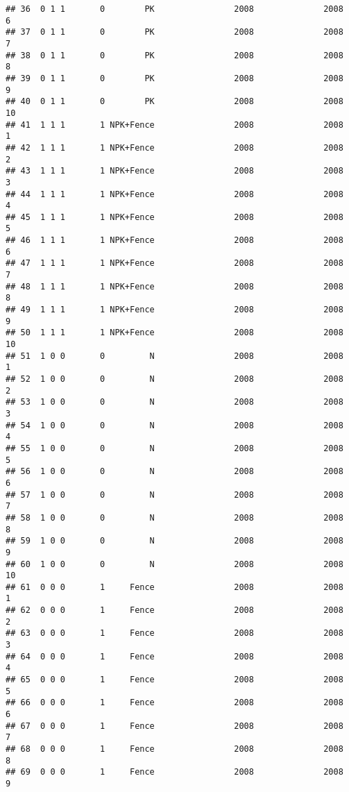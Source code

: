 \documentclass[]{article}
\begin{document}
\begin{verbatim}
## 36  0 1 1       0        PK                2008              2008        6
## 37  0 1 1       0        PK                2008              2008        7
## 38  0 1 1       0        PK                2008              2008        8
## 39  0 1 1       0        PK                2008              2008        9
## 40  0 1 1       0        PK                2008              2008       10
## 41  1 1 1       1 NPK+Fence                2008              2008        1
## 42  1 1 1       1 NPK+Fence                2008              2008        2
## 43  1 1 1       1 NPK+Fence                2008              2008        3
## 44  1 1 1       1 NPK+Fence                2008              2008        4
## 45  1 1 1       1 NPK+Fence                2008              2008        5
## 46  1 1 1       1 NPK+Fence                2008              2008        6
## 47  1 1 1       1 NPK+Fence                2008              2008        7
## 48  1 1 1       1 NPK+Fence                2008              2008        8
## 49  1 1 1       1 NPK+Fence                2008              2008        9
## 50  1 1 1       1 NPK+Fence                2008              2008       10
## 51  1 0 0       0         N                2008              2008        1
## 52  1 0 0       0         N                2008              2008        2
## 53  1 0 0       0         N                2008              2008        3
## 54  1 0 0       0         N                2008              2008        4
## 55  1 0 0       0         N                2008              2008        5
## 56  1 0 0       0         N                2008              2008        6
## 57  1 0 0       0         N                2008              2008        7
## 58  1 0 0       0         N                2008              2008        8
## 59  1 0 0       0         N                2008              2008        9
## 60  1 0 0       0         N                2008              2008       10
## 61  0 0 0       1     Fence                2008              2008        1
## 62  0 0 0       1     Fence                2008              2008        2
## 63  0 0 0       1     Fence                2008              2008        3
## 64  0 0 0       1     Fence                2008              2008        4
## 65  0 0 0       1     Fence                2008              2008        5
## 66  0 0 0       1     Fence                2008              2008        6
## 67  0 0 0       1     Fence                2008              2008        7
## 68  0 0 0       1     Fence                2008              2008        8
## 69  0 0 0       1     Fence                2008              2008        9

\end{verbatim}
\end{document}
